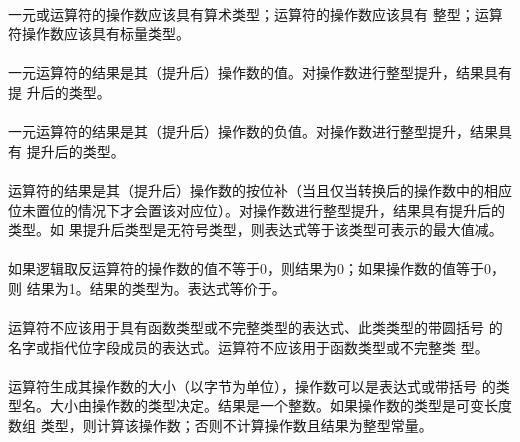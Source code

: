 {                                  
\constraint
\paragraph{}
一元\tm{+}或\tm{-}运算符的操作数应该具有算术类型；\tm{\~}运算符的操作数应该具有
整型；\tm{!}运算符操作数应该具有标量类型。

\semantic
\paragraph{}
一元\tm{+}运算符的结果是其（提升后）操作数的值。对操作数进行整型提升，结果具有提
升后的类型。

\paragraph{}
一元\tm{-}运算符的结果是其（提升后）操作数的负值。对操作数进行整型提升，结果具有
提升后的类型。

\paragraph{}
运算符\tm{\~}的结果是其（提升后）操作数的按位补（当且仅当转换后的操作数中的相应
位未置位的情况下才会置该对应位）。对操作数进行整型提升，结果具有提升后的类型。如
果提升后类型是无符号类型，则表达式等于该类型可表示的最大值减。

\paragraph{}
如果逻辑取反运算符\tm{!}的操作数的值不等于0，则结果为0；如果操作数的值等于0，则
结果为1。结果的类型为。表达式等价于。

\constraint
\paragraph{}
运算符不应该用于具有函数类型或不完整类型的表达式、此类类型的带圆括号
的名字或指代位字段成员的表达式。运算符不应该用于函数类型或不完整类
型。

\semantic
\paragraph{}
运算符生成其操作数的大小（以字节为单位），操作数可以是表达式或带括号
的类型名。大小由操作数的类型决定。结果是一个整数。如果操作数的类型是可变长度数组
类型，则计算该操作数；否则不计算操作数且结果为整型常量。

}
